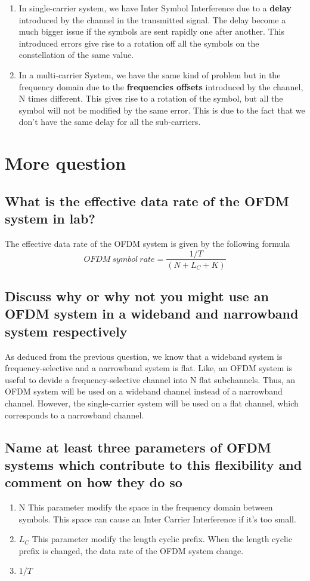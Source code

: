 \documentclass[frenchb, oneside, headings=normal]{scrartcl}
\begin{document}
\begin{enumerate}
\item In single-carrier system, we have Inter Symbol Interference due to a \textbf{delay} introduced by the channel in the transmitted signal. The delay become a much bigger issue if the symbols are sent rapidly one after another. This introduced errors give rise to a rotation off all the symbols on the constellation of the same value.

\item In a multi-carrier System, we have the same kind of problem but in the frequency domain due to the \textbf{frequencies offsets} introduced by the channel, N times different. This gives rise to a rotation of the symbol, but all the symbol will not be modified by the same error. This is due to the fact that we don't have the same delay for all the sub-carriers.

\end{enumerate}

\section{More question}

\subsection{What is the effective data rate of the OFDM system in lab?}
The effective data rate of the OFDM system is given by the following formula
$$OFDM~symbol~rate = \frac{1/T}{(N + L_C + K)} $$
\subsection{Discuss why or why not you might use an OFDM system in a wideband and narrowband system respectively}

As deduced from the previous question, we know that a wideband system is frequency-selective and a narrowband system is flat. Like, an OFDM system is useful to devide a frequency-selective channel into N flat subchannels. Thus, an OFDM system will be used on a wideband channel instead of a narrowband channel.
However, the single-carrier system will be used on a flat channel, which corresponds to a narrowband channel.

\subsection{Name at least three parameters of OFDM systems which contribute to this flexibility and comment on how they do so}
\begin{enumerate}
\item N This parameter modify the space in the frequency domain between symbols.   This space can cause an Inter Carrier Interference if it's too small.
\item $L_C$ This parameter modify the length cyclic prefix. When the length cyclic prefix is changed, the data rate of the OFDM system change. 
\item $1/T$ 
\end{enumerate}
\end{document}
